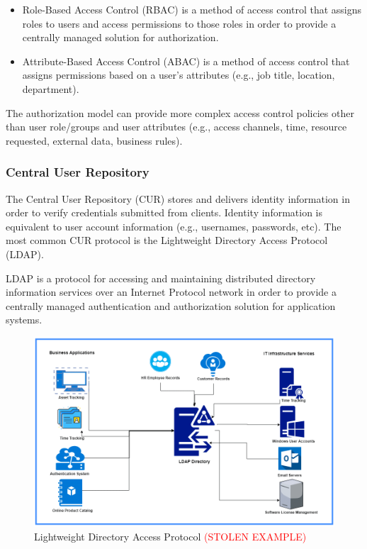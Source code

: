 \begin{itemize}
    \item Role-Based Access Control (RBAC) is a method of access control that assigns roles to users  and access permissions to those roles in order to provide a centrally managed solution for authorization. 
    \item Attribute-Based Access Control (ABAC) is a method of access control that assigns permissions based on a user's attributes (e.g., job title, location, department). 
\end{itemize}

The authorization model can provide more complex access control policies other than user role/groups and user attributes (e.g., access channels, time, resource requested, external data, business rules). 

\subsubsection{Central User Repository}
The Central User Repository (CUR) stores and delivers identity information in order to verify credentials submitted from clients. Identity information is equivalent to user account information (e.g., usernames, passwords, etc). The most common CUR protocol is the Lightweight Directory Access Protocol (LDAP). 

LDAP is a protocol for accessing and maintaining distributed directory information services over an Internet Protocol network in order to provide a centrally managed authentication and authorization solution for application systems. 

\begin{figure}[H]
    \centering
    \includegraphics[scale = 0.6]{images/LDAP.png}
    \caption{Lightweight Directory Access Protocol \textcolor{red}{(STOLEN EXAMPLE)} }
    \label{LDAP}
\end{figure}

